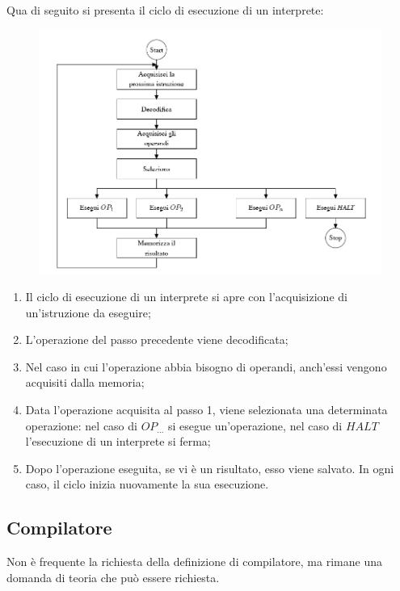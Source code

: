 \documentclass[a4paper]{article}
\begin{document}
	\noindent
	Qua di seguito si presenta il ciclo di esecuzione di un interprete:
	\begin{figure}[!htp]
		\centering
		\includegraphics[width=\textwidth]{img/ex1-2.png}
	\end{figure}
	\begin{enumerate}
		\item Il ciclo di esecuzione di un interprete si apre con l'acquisizione di un'istruzione da eseguire;
		
		\item L'operazione del passo precedente viene decodificata;
		
		\item Nel caso in cui l'operazione abbia bisogno di operandi, anch'essi vengono acquisiti dalla memoria;
		
		\item Data l'operazione acquisita al passo 1, viene selezionata una determinata operazione: nel caso di $OP_{...}$ si esegue un'operazione, nel caso di $HALT$ l'esecuzione di un interprete si ferma;
		
		\item Dopo l'operazione eseguita, se vi è un risultato, esso viene salvato. In ogni caso, il ciclo inizia nuovamente la sua esecuzione.
	\end{enumerate}
	
	\newpage
	\subsection{Compilatore}
	
	Non è frequente la richiesta della definizione di compilatore, ma rimane una domanda di teoria che può essere richiesta.\newline
	
\end{document}
